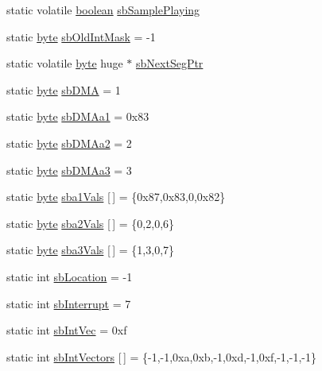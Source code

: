 \begin{DoxyCompactItemize}
\item 
static volatile \hyperlink{ID__HEAD_8H_a7c6368b321bd9acd0149b030bb8275ed}{boolean} \hyperlink{ID__SD_8C_afa8de5ddf3415c8a315d1de59fd25477}{sbSamplePlaying}
\item 
static \hyperlink{ID__HEAD_8H_a0c8186d9b9b7880309c27230bbb5e69d}{byte} \hyperlink{ID__SD_8C_a625876d28c2c21e717bec3903f217277}{sbOldIntMask} = -\/1
\item 
static volatile \hyperlink{ID__HEAD_8H_a0c8186d9b9b7880309c27230bbb5e69d}{byte} huge $\ast$ \hyperlink{ID__SD_8C_a2c977a80978d5b38196f2154168d95b1}{sbNextSegPtr}
\item 
static \hyperlink{ID__HEAD_8H_a0c8186d9b9b7880309c27230bbb5e69d}{byte} \hyperlink{ID__SD_8C_a230fef19af8ffe22851d12f5221ac36a}{sbDMA} = 1
\item 
static \hyperlink{ID__HEAD_8H_a0c8186d9b9b7880309c27230bbb5e69d}{byte} \hyperlink{ID__SD_8C_a029be078b8479543113f4b29b7030778}{sbDMAa1} = 0x83
\item 
static \hyperlink{ID__HEAD_8H_a0c8186d9b9b7880309c27230bbb5e69d}{byte} \hyperlink{ID__SD_8C_a6ecbb8a785e72da500e045352ca9fa15}{sbDMAa2} = 2
\item 
static \hyperlink{ID__HEAD_8H_a0c8186d9b9b7880309c27230bbb5e69d}{byte} \hyperlink{ID__SD_8C_ab3f0ab9731e991810f84e1ef14ef28a1}{sbDMAa3} = 3
\item 
static \hyperlink{ID__HEAD_8H_a0c8186d9b9b7880309c27230bbb5e69d}{byte} \hyperlink{ID__SD_8C_ac10063bd8284cccb099c26a99f7a3f2d}{sba1Vals} \mbox{[}$\,$\mbox{]} = \{0x87,0x83,0,0x82\}
\item 
static \hyperlink{ID__HEAD_8H_a0c8186d9b9b7880309c27230bbb5e69d}{byte} \hyperlink{ID__SD_8C_a6a205b1751d365f5b708db37c7085ee6}{sba2Vals} \mbox{[}$\,$\mbox{]} = \{0,2,0,6\}
\item 
static \hyperlink{ID__HEAD_8H_a0c8186d9b9b7880309c27230bbb5e69d}{byte} \hyperlink{ID__SD_8C_a571f30f53c21bcb0874d635d10c0ce3c}{sba3Vals} \mbox{[}$\,$\mbox{]} = \{1,3,0,7\}
\item 
static int \hyperlink{ID__SD_8C_ad1041dc24d08c7fc215c300fe99c1609}{sbLocation} = -\/1
\item 
static int \hyperlink{ID__SD_8C_a5e6359cd4b8a27fa08fd27097c547e5d}{sbInterrupt} = 7
\item 
static int \hyperlink{ID__SD_8C_a52f9935f686fca626defb7ec36292506}{sbIntVec} = 0xf
\item 
static int \hyperlink{ID__SD_8C_a74811b52c1a1ba6decadc52cfa225e25}{sbIntVectors} \mbox{[}$\,$\mbox{]} = \{-\/1,-\/1,0xa,0xb,-\/1,0xd,-\/1,0xf,-\/1,-\/1,-\/1\}

\end{DoxyCompactItemize}
